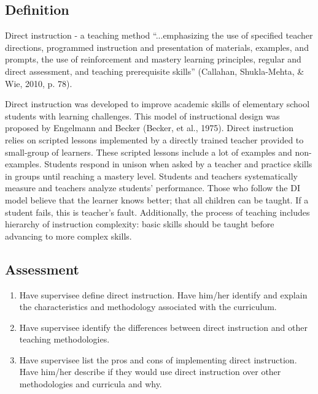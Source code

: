 \subsection{Definition}
Direct instruction - a teaching method ``...emphasizing the use of specified teacher directions, programmed instruction and presentation of materials, examples, and prompts, the use of reinforcement and mastery learning principles, regular and direct assessment, and teaching prerequisite skills'' (Callahan, Shukla-Mehta, \& Wie, 2010, p. 78).

Direct instruction was developed to improve academic skills of elementary school students with learning challenges. This model of instructional design was proposed by Engelmann and Becker (Becker, et al., 1975). Direct instruction relies on scripted lessons implemented by a directly trained teacher provided to small-group of learners.  These scripted lessons include a lot of examples and non-examples. Students respond in unison when asked by a teacher and practice skills in groups until reaching a mastery level. Students and teachers systematically measure and teachers analyze students' performance. Those who follow the DI model believe that the learner knows better; that all children can be taught. If a student fails, this is teacher's fault. Additionally, the process of teaching includes hierarchy of instruction complexity: basic skills should be taught before advancing to more complex skills. 
%
\subsection{Assessment}
\begin{enumerate}
\item Have supervisee define direct instruction. Have him/her identify and explain the characteristics and methodology associated with the curriculum.
\item Have supervisee identify the differences between direct instruction and other teaching methodologies.
\item Have supervisee list the pros and cons of implementing direct instruction. Have him/her describe if they would use direct instruction over other methodologies and curricula and why.
%
\end{enumerate}
%
